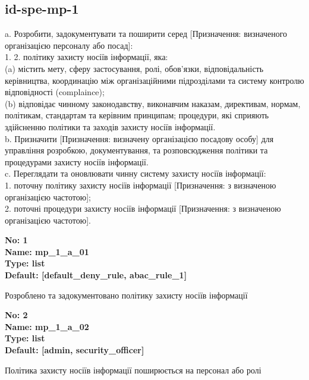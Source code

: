 \documentclass{article}
\begin{document}
\subsection{id-spe-mp-1}
a. Розробити, задокументувати та поширити серед [Призначення: визначеного організацією персоналу або посад]:\\ 
1. 2. політику захисту носіїв інформації, яка:\\ 
(a) містить мету, сферу застосування, ролі, обов'язки, відповідальність керівництва, координацію між організаційними підрозділами та систему контролю відповідності (complaince);\\ 
(b) відповідає чинному законодавству, виконавчим наказам, директивам, нормам, політикам, стандартам та керівним принципам; процедури, які сприяють здійсненню політики та заходів захисту носіїв інформації.\\ 
b. Призначити [Призначення: визначену організацією посадову особу] для управління розробкою, документування, та розповсюдження політики та процедурами захисту носіїв інформації.\\ 
c. Переглядати та оновлювати чинну систему захисту носіїв інформації:\\ 
1. поточну політику захисту носіїв інформації [Призначення: з визначеною організацією частотою];\\ 
2. поточні процедури захисту носіїв інформації [Призначення: з визначеною організацією частотою].

\vspace{10pt}
{\footnotesize\bfseries
No: 1\\
Name: mp\_\allowbreak{}1\_\allowbreak{}a\_\allowbreak{}01\\
Type: list\\
Default: [\textquotedbl{}default\_\allowbreak{}deny\_\allowbreak{}rule\textquotedbl{}, \textquotedbl{}abac\_\allowbreak{}rule\_\allowbreak{}1\textquotedbl{}]
}

{\footnotesize Розроблено та задокументовано політику захисту носіїв інформації}


{\footnotesize\bfseries
No: 2\\
Name: mp\_\allowbreak{}1\_\allowbreak{}a\_\allowbreak{}02\\
Type: list\\
Default: [\textquotedbl{}admin\textquotedbl{}, \textquotedbl{}security\_\allowbreak{}officer\textquotedbl{}]
}

{\footnotesize Політика захисту носіїв інформації поширюється на персонал або ролі}
\end{document}
